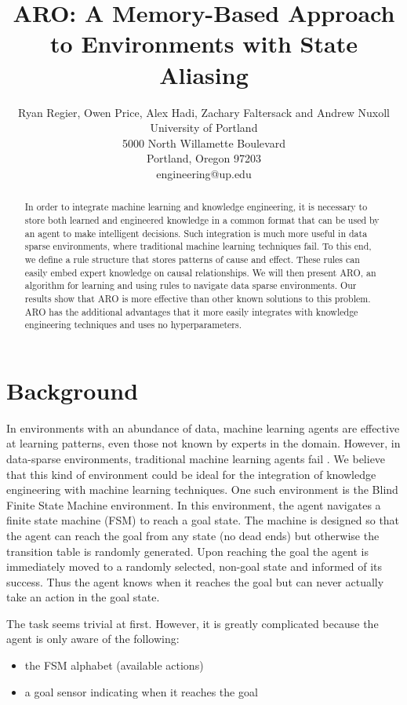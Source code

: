 \documentclass[letterpaper]{article} %
\title{ARO:  A Memory-Based Approach to Environments with State Aliasing }
\author{Ryan Regier, Owen Price, Alex Hadi, Zachary Faltersack and Andrew Nuxoll \\ 
University of Portland\\ %
5000 North Willamette Boulevard\\
Portland, Oregon 97203\\
engineering@up.edu %
}
\begin{document}
\maketitle

\begin{abstract}

In order to integrate machine learning and knowledge engineering, it
is necessary to store both learned and engineered knowledge in a
common format that can be used by an agent to make intelligent
decisions. Such integration is much more useful in data sparse
environments, where traditional machine learning techniques fail.  To
this end, we define a rule structure that stores patterns of cause and
effect. These rules can easily embed expert knowledge on causal
relationships. We will then present ARO, an algorithm for learning and
using rules to navigate data sparse environments. Our results show
that ARO is more effective than other known solutions to this
problem. ARO has the additional advantages that it more easily
integrates with knowledge engineering techniques and uses no
hyperparameters.

\end{abstract}

\noindent




\section{Background}

In environments with an abundance of data, machine learning agents are
effective at learning patterns, even those not known by experts in the
domain. However, in data-sparse environments, traditional machine
learning agents fail \cite{Chrisman92}. We believe that this kind of
environment could be ideal for the integration of knowledge
engineering with machine learning techniques. One such environment is
the Blind Finite State Machine environment.  In this environment, the
agent navigates a finite state machine (FSM) \cite{Hopcroft06} to
reach a goal state.  The machine is designed so that the agent can
reach the goal from any state (no dead ends) but otherwise the
transition table is randomly generated.  Upon reaching the goal the
agent is immediately moved to a randomly selected, non-goal state and
informed of its success.  Thus the agent knows when it reaches the
goal but can never actually take an action in the goal state.

The task seems trivial at first.  However, it is greatly complicated
because the agent is only aware of the following:
\begin{itemize}
\item the FSM alphabet (available actions)
\item a goal sensor indicating when it reaches the goal
\end{itemize}
\end{document}
